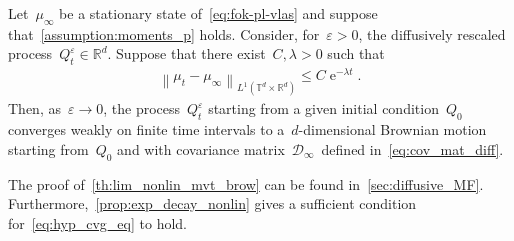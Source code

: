 \documentclass[onefignum,onetabnum]{siamart251216} %
\DeclareMathOperator{\e}{e}
\newcommand{\norm}[1]{\left\lVert#1\right\rVert}
\newcommand{\torus}{\mathbb T}
\newcommand{\real}{\mathbb R}
\newcommand{\mc}[1]{\mathcal{#1}}
\renewcommand{\leq}{\leqslant}
\newcommand{\mescin}{\mu}
\newcommand{\eps}{\varepsilon}
\newcommand{\rg}[1]{\textcolor{rose}{\rm{[RG : #1]}}}
\theoremstyle{plain}
\numberwithin{equation}{section}
\numberwithin{theorem}{section}
\begin{document}
\begin{theorem}
    \label{th:lim_nonlin_mvt_brow}
    Let~$\mescin_\infty$ be a stationary state of~\eqref{eq:fok-pl-vlas} and suppose that~\cref{assumption:moments_p} holds. Consider, for~$\eps>0$, the diffusively rescaled process~$Q_t^{\eps} \in \real^d$.
    Suppose that there exist~$C,\lambda > 0$ such that
    \begin{align}
        \label{eq:hyp_cvg_eq}
        \norm{\mu_t - \mescin_\infty}_{L^1(\torus^d \times \real^d)} \leq C\e^{-\lambda t}.
    \end{align}
    Then, as~$\eps \rightarrow 0$, the process~$Q_t^{\eps}$ starting from a given initial condition~$Q_0$ converges weakly on finite time intervals to a~$d$-dimensional Brownian motion starting from~$Q_0$ and with covariance matrix~$\mc{D}_\infty$~defined in~\eqref{eq:cov_mat_diff}.
\end{theorem}
The proof of~\cref{th:lim_nonlin_mvt_brow} can be found in~\cref{sec:diffusive_MF}. Furthermore,~\cref{prop:exp_decay_nonlin} gives a sufficient condition for~\eqref{eq:hyp_cvg_eq} to hold.
%
%
\end{document}
